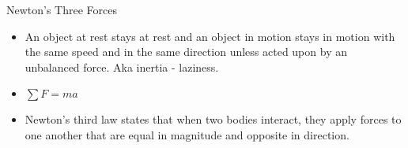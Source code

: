 \documentclass{scrreprt} %
\begin{document}
Newton's Three Forces

\begin{itemize}
	\item An object at rest stays at rest and an object in motion stays in
	motion with the same speed and in the same direction unless acted upon by an
	unbalanced force. Aka inertia - laziness.
	\item $\sum F = ma$
	\item Newton’s third law states that when two bodies interact, they apply
	forces to one another that are equal in magnitude and opposite in direction.
\end{itemize}
\end{document}
